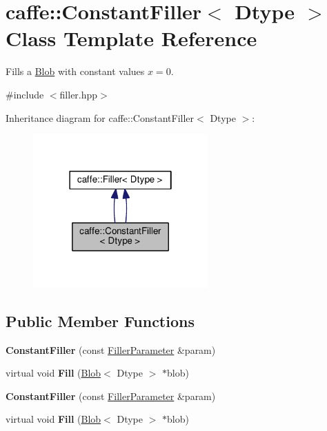\hypertarget{classcaffe_1_1_constant_filler}{}\section{caffe\+:\+:Constant\+Filler$<$ Dtype $>$ Class Template Reference}
\label{classcaffe_1_1_constant_filler}


Fills a \mbox{\hyperlink{classcaffe_1_1_blob}{Blob}} with constant values $ x = 0 $.  




{\ttfamily \#include $<$filler.\+hpp$>$}



Inheritance diagram for caffe\+:\+:Constant\+Filler$<$ Dtype $>$\+:
\nopagebreak
\begin{figure}[H]
\begin{center}
\leavevmode
\includegraphics[width=190pt]{classcaffe_1_1_constant_filler__inherit__graph}
\end{center}
\end{figure}
\subsection*{Public Member Functions}
\begin{DoxyCompactItemize}
\item 
\mbox{\label{classcaffe_1_1_constant_filler_ac6bd25bc764935cb5261d0279a772001}} 
{\bfseries Constant\+Filler} (const \mbox{\hyperlink{classcaffe_1_1_filler_parameter}{Filler\+Parameter}} \&param)
\item 
\mbox{\label{classcaffe_1_1_constant_filler_a411cf44b177109c388c0b34c906f4e8e}} 
virtual void {\bfseries Fill} (\mbox{\hyperlink{classcaffe_1_1_blob}{Blob}}$<$ Dtype $>$ $\ast$blob)
\item 
\mbox{\label{classcaffe_1_1_constant_filler_ac6bd25bc764935cb5261d0279a772001}} 
{\bfseries Constant\+Filler} (const \mbox{\hyperlink{classcaffe_1_1_filler_parameter}{Filler\+Parameter}} \&param)
\item 
\mbox{\label{classcaffe_1_1_constant_filler_a411cf44b177109c388c0b34c906f4e8e}} 
virtual void {\bfseries Fill} (\mbox{\hyperlink{classcaffe_1_1_blob}{Blob}}$<$ Dtype $>$ $\ast$blob)
\end{DoxyCompactItemize}
